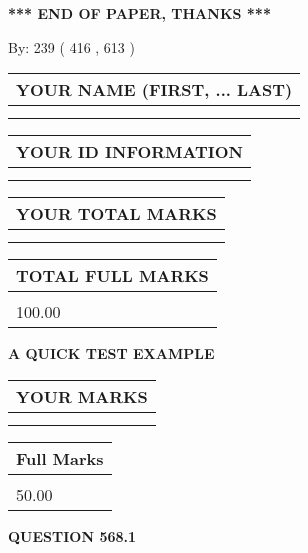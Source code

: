 \documentclass[12pt]{article}
\begin{document}
\vspace{1.0in} 
{\textbf{\large{ *** END OF PAPER, THANKS *** }}} 
   
   
\hspace{1.0in} By: 
 239 ( 416 ,  613 )
   
   
   
   
\newpage 
\setcounter{page}{ 
   568001 } 
   
   
   
   
\noindent\begin{tabular}{|l|}
\hline
YOUR NAME (FIRST, ... LAST)  \\
\hline
 \\ 
 \\ 
\hline
\end{tabular}
\hspace{0.05in} \begin{tabular}{|l|}
\hline
 YOUR   ID   INFORMATION  \\
\hline
 \\ 
 \\ 
\hline
\end{tabular}
   
   
\vspace{0.2in}\noindent\begin{tabular}{|l|}
\hline
YOUR TOTAL MARKS  \\
\hline
 \\ 
 \\ 
\hline
\end{tabular}
\hspace{0.05in} \begin{tabular}{|l|}
\hline
TOTAL FULL MARKS  \\
\hline
 \\ 
100.00 \\
\hline
\end{tabular}
   
   
 \vspace{0.2in}
{\LARGE {\textbf{ A QUICK TEST EXAMPLE}}}
   
   
  
\vspace{0.2in}
  
\noindent\begin{tabular}{|l|}
\hline
 YOUR MARKS  \\
\hline
 \\ 
 \\ 
\hline
\end{tabular}
\hspace{0.05in} \begin{tabular}{|l|}
\hline
 Full Marks  \\
\hline
 \\ 
50.00 \\
\hline
\end{tabular}
{\textbf{\Large{QUESTION
568.1 
}}}
  
\end{document}
